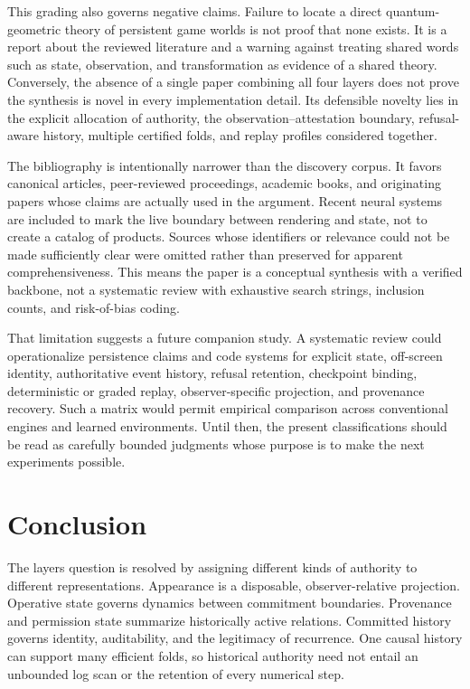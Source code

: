 \documentclass[11pt]{article}
\begin{document}
This grading also governs negative claims. Failure to locate a direct quantum-geometric theory of persistent game worlds is not proof that none exists. It is a report about the reviewed literature and a warning against treating shared words such as state, observation, and transformation as evidence of a shared theory. Conversely, the absence of a single paper combining all four layers does not prove the synthesis is novel in every implementation detail. Its defensible novelty lies in the explicit allocation of authority, the observation--attestation boundary, refusal-aware history, multiple certified folds, and replay profiles considered together.

The bibliography is intentionally narrower than the discovery corpus. It favors canonical articles, peer-reviewed proceedings, academic books, and originating papers whose claims are actually used in the argument. Recent neural systems are included to mark the live boundary between rendering and state, not to create a catalog of products. Sources whose identifiers or relevance could not be made sufficiently clear were omitted rather than preserved for apparent comprehensiveness. This means the paper is a conceptual synthesis with a verified backbone, not a systematic review with exhaustive search strings, inclusion counts, and risk-of-bias coding.

That limitation suggests a future companion study. A systematic review could operationalize persistence claims and code systems for explicit state, off-screen identity, authoritative event history, refusal retention, checkpoint binding, deterministic or graded replay, observer-specific projection, and provenance recovery. Such a matrix would permit empirical comparison across conventional engines and learned environments. Until then, the present classifications should be read as carefully bounded judgments whose purpose is to make the next experiments possible.

\section{Conclusion}

The layers question is resolved by assigning different kinds of authority to different representations. Appearance is a disposable, observer-relative projection. Operative state governs dynamics between commitment boundaries. Provenance and permission state summarize historically active relations. Committed history governs identity, auditability, and the legitimacy of recurrence. One causal history can support many efficient folds, so historical authority need not entail an unbounded log scan or the retention of every numerical step.
\end{document}
